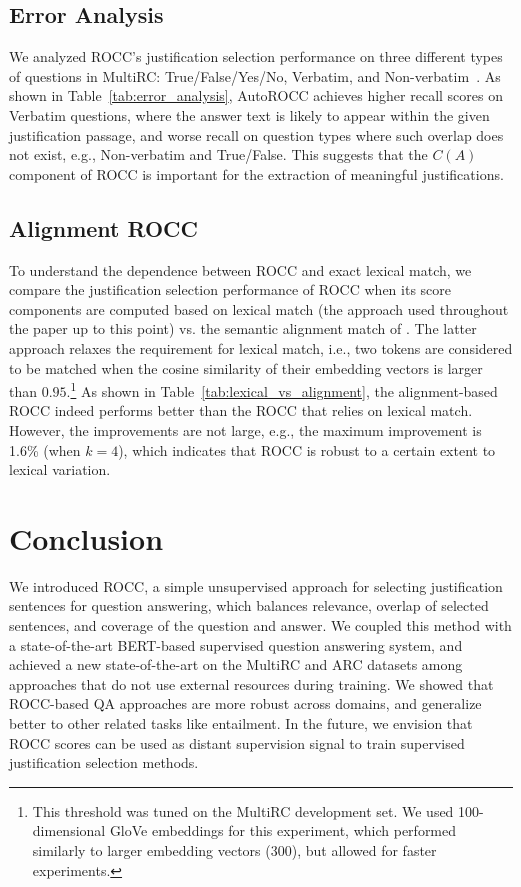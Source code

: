 \subsection{Error Analysis}

We analyzed ROCC's justification selection performance on three different types of questions in MultiRC: True/False/Yes/No, Verbatim, and Non-verbatim~\cite{khashabi2018question}. As shown in Table~\ref{tab:error_analysis}, AutoROCC achieves higher recall scores on Verbatim questions, where the answer text is likely to appear within the given justification passage, and worse recall on question types where such overlap does not exist, e.g., Non-verbatim and True/False. This suggests that the $C(A)$ component of ROCC is important for the extraction of meaningful justifications.

\subsection{Alignment ROCC}

To understand the dependence between ROCC and exact lexical match, we compare the justification selection performance of ROCC when its score components are computed based on lexical match (the approach used throughout the paper up to this point) vs. the semantic alignment match of \citet{yadav2018sanity}. The latter approach relaxes the requirement for lexical match, i.e., two tokens are considered to be matched when the cosine similarity of their embedding vectors is larger than $0.95$.\footnote{This threshold was tuned on the MultiRC development set. We used 100-dimensional GloVe embeddings for this experiment, which performed similarly to larger embedding vectors (300), but allowed for faster experiments.} As shown in Table~\ref{tab:lexical_vs_alignment}, the alignment-based ROCC indeed performs better than the ROCC that relies on lexical match. However, the improvements are not large, e.g., the maximum improvement is 1.6\% (when $k=4$), which indicates that ROCC is robust to a certain extent to lexical variation.

\section{Conclusion}

We introduced ROCC, a simple unsupervised approach for selecting justification sentences for question answering, which balances relevance, overlap of selected sentences, and coverage of the question and answer. We coupled this method with a state-of-the-art BERT-based supervised question answering system, and achieved a new state-of-the-art on the MultiRC and ARC datasets among approaches that do not use external resources during training. We showed that ROCC-based QA approaches are more robust across domains, and generalize better to other related tasks like entailment. In the future, we envision that ROCC scores can be used as distant supervision signal to train supervised justification selection methods.



